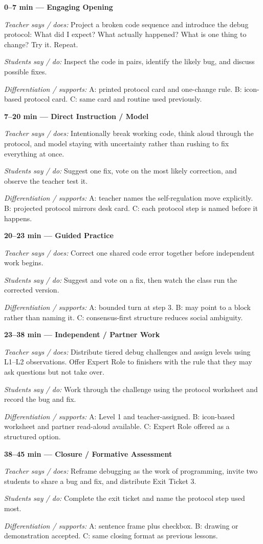 \documentclass[12pt]{article}
\newcommand{\lessonphase}[5]{%
\noindent\textbf{\color{brickRed}#1 --- #2}\par
\textit{Teacher says / does:} #3\par
\textit{Students say / do:} #4\par
\textit{Differentiation / supports:} #5\par\medskip
}
\begin{document}
\begin{designbox}
\vspace{-0.1cm}
\lessonphase{0--7 min}{Engaging Opening}
{Project a broken code sequence and introduce the debug protocol: What did I expect? What actually happened? What is one thing to change? Try it. Repeat.}
{Inspect the code in pairs, identify the likely bug, and discuss possible fixes.}
{A: printed protocol card and one-change rule. B: icon-based protocol card. C: same card and routine used previously.}

\vspace{-0.1cm}
\lessonphase{7--20 min}{Direct Instruction / Model}
{Intentionally break working code, think aloud through the protocol, and model staying with uncertainty rather than rushing to fix everything at once.}
{Suggest one fix, vote on the most likely correction, and observe the teacher test it.}
{A: teacher names the self-regulation move explicitly. B: projected protocol mirrors desk card. C: each protocol step is named before it happens.}

\vspace{-0.1cm}
\lessonphase{20--23 min}{Guided Practice}
{Correct one shared code error together before independent work begins.}
{Suggest and vote on a fix, then watch the class run the corrected version.}
{A: bounded turn at step 3. B: may point to a block rather than naming it. C: consensus-first structure reduces social ambiguity.}

\vspace{-0.1cm}
\lessonphase{23--38 min}{Independent / Partner Work}
{Distribute tiered debug challenges and assign levels using L1--L2 observations. Offer Expert Role to finishers with the rule that they may ask questions but not take over.}
{Work through the challenge using the protocol worksheet and record the bug and fix.}
{A: Level 1 and teacher-assigned. B: icon-based worksheet and partner read-aloud available. C: Expert Role offered as a structured option.}

\vspace{-0.1cm}
\lessonphase{38--45 min}{Closure / Formative Assessment}
{Reframe debugging as the work of programming, invite two students to share a bug and fix, and distribute Exit Ticket 3.}
{Complete the exit ticket and name the protocol step used most.}
{A: sentence frame plus checkbox. B: drawing or demonstration accepted. C: same closing format as previous lessons.}
\end{designbox}
\end{document}
